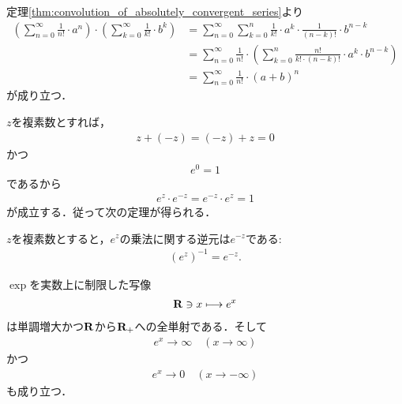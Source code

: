 	\begin{sketch}
		定理\ref{thm:convolution_of_absolutely_convergent_series}より
		\begin{align}
			\left(\sum_{n=0}^\infty \frac{1}{n!} \cdot a^n\right) \cdot \left(\sum_{k=0}^\infty \frac{1}{k!} \cdot b^k\right)
			&= \sum_{n=0}^\infty \sum_{k=0}^n \frac{1}{k!} \cdot a^k \cdot \frac{1}{(n-k)!} \cdot b^{n-k} \\
			&= \sum_{n=0}^\infty \frac{1}{n!} \cdot \left( \sum_{k=0}^n \frac{n!}{k! \cdot (n-k)!} \cdot a^k \cdot b^{n-k} \right) \\
			&= \sum_{n=0}^\infty \frac{1}{n!} \cdot (a+b)^n
		\end{align}
		が成り立つ．
		\QED
	\end{sketch}
	
	$z$を複素数とすれば，
	\begin{align}
		z + (-z) = (-z) + z = 0
	\end{align}
	かつ
	\begin{align}
		e^0 = 1
	\end{align}
	であるから
	\begin{align}
		e^z \cdot e^{-z} = e^{-z} \cdot e^z = 1
	\end{align}
	が成立する．従って次の定理が得られる．
	
	\begin{screen}
		\begin{thm}[$e$のマイナス乗は逆元]\label{thm:inversion_of_exp_z_is_exp_minus_z}
			$z$を複素数とすると，$e^z$の乗法に関する逆元は$e^{-z}$である:
			\begin{align}
				(e^z)^{-1} = e^{-z}.
			\end{align}
		\end{thm}
	\end{screen}
	
	\begin{screen}
		\begin{thm}[指数関数は実数上で単調増大かつ一対一対応]\label{thm:real_valued_exponential_function}
			$\exp$を実数上に制限した写像
			\begin{align}
				\mathbf{R} \ni x \longmapsto e^x
			\end{align}
			は単調増大かつ$\mathbf{R}$から$\mathbf{R}_+$への全単射である．そして
			\begin{align}
				e^x \longrightarrow \infty \quad (x \longrightarrow \infty)
			\end{align}
			かつ
			\begin{align}
				e^x \longrightarrow 0 \quad (x \longrightarrow -\infty)
			\end{align}
			も成り立つ．
		\end{thm}
	\end{screen}
	
